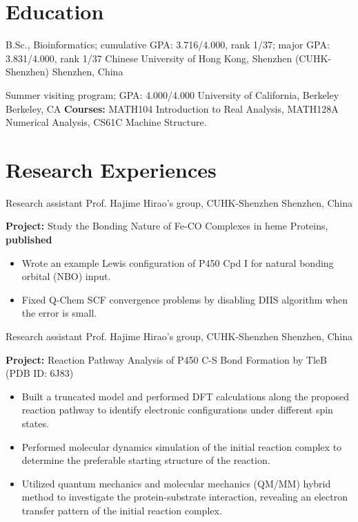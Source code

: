 \documentclass[11pt]{moderncv}
\begin{document}
\maketitle



\vspace{-3em}
\section{Education}
{B.Sc., Bioinformatics; cumulative GPA: 3.716/4.000, rank 1/37; major GPA: 3.831/4.000, rank 1/37}
{Chinese University of Hong Kong, Shenzhen (CUHK-Shenzhen)}
{Shenzhen, China}
{}
{}

{Summer visiting program; GPA: 4.000/4.000}
{University of California, Berkeley}
{Berkeley, CA}
{}
{\textbf{Courses:} MATH104 Introduction to Real Analysis, MATH128A Numerical Analysis, CS61C Machine Structure.}


\vspace{-0.75em}
\section{Research Experiences}
{Research assistant}
{Prof. Hajime Hirao's group, CUHK-Shenzhen}
{Shenzhen, China}
{}
{\textbf{Project:} Study the Bonding Nature of Fe-CO Complexes in heme Proteins, \textbf{published}
    \begin{itemize}\setlength\itemsep{-1pt}
        \item Wrote an example Lewis configuration of P450 Cpd I for natural bonding orbital (NBO) input.
        \item Fixed Q-Chem SCF convergence problems by disabling DIIS algorithm when the error is small.
    \end{itemize}
}

{Research assistant}
{Prof. Hajime Hirao's group, CUHK-Shenzhen}
{Shenzhen, China}
{}
{\textbf {Project:} Reaction Pathway Analysis of P450 C-S Bond Formation by TleB (PDB ID: 6J83)
    \begin{itemize}\setlength\itemsep{-1pt}
    \item Built a truncated model and performed DFT calculations along the proposed reaction pathway to identify electronic configurations under different spin states.
    \item Performed molecular dynamics simulation of the initial reaction complex to determine the preferable starting structure of the reaction.
    \item Utilized quantum mechanics and molecular mechanics (QM/MM) hybrid method to investigate the protein-substrate interaction, revealing an electron transfer pattern of the initial reaction complex.
\end{itemize}
}
\end{document}
